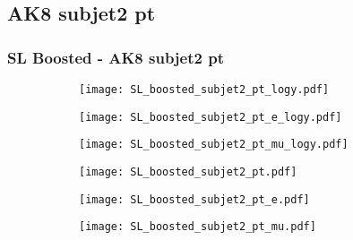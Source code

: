 \documentclass[aspectratio=169,8pt]{beamer}
\begin{document}
\subsection{AK8 subjet2 pt}
\begin{frame}
\frametitle{SL Boosted - AK8 subjet2 pt}
\begin{figure}
\captionsetup[subfigure]{labelformat=empty}
\begin{subfigure}{0.32\textwidth}
\texttt{[image: SL\_boosted\_subjet2\_pt\_logy.pdf]}
\vspace*{-0.15cm}
\end{subfigure}
\hfil
\begin{subfigure}{0.32\textwidth}
\texttt{[image: SL\_boosted\_subjet2\_pt\_e\_logy.pdf]}
\vspace*{-0.15cm}
\end{subfigure}
\hfil
\begin{subfigure}{0.32\textwidth}
\texttt{[image: SL\_boosted\_subjet2\_pt\_mu\_logy.pdf]}
\vspace*{-0.15cm}
\end{subfigure}
\hfil
\begin{subfigure}{0.32\textwidth}
\texttt{[image: SL\_boosted\_subjet2\_pt.pdf]}
\vspace*{-0.15cm}
\end{subfigure}
\hfil
\begin{subfigure}{0.32\textwidth}
\texttt{[image: SL\_boosted\_subjet2\_pt\_e.pdf]}
\vspace*{-0.15cm}
\end{subfigure}
\hfil
\begin{subfigure}{0.32\textwidth}
\texttt{[image: SL\_boosted\_subjet2\_pt\_mu.pdf]}
\vspace*{-0.15cm}
\end{subfigure}
\hfil
\end{figure}
\end{frame}
\newpage
\end{document}
